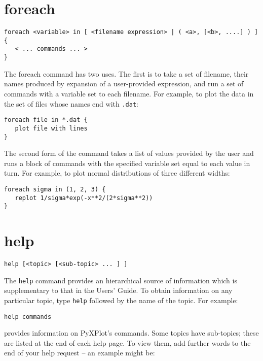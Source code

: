 \section{foreach}

\begin{verbatim}
foreach <variable> in [ <filename expression> | ( <a>, [<b>, ....] ) ] {
   < ... commands ... >
}
\end{verbatim}

The foreach command has two uses.  The first is to take a set of filename, their
names produced by expansion of a user-provided expression, and run a set of
commands with a variable set to each filename.  For example, to plot the data in
the set of files whose names end with {\tt .dat}:

\begin{verbatim}
foreach file in *.dat {
   plot file with lines
}
\end{verbatim}

The second form of the command takes a list of values provided by the user and
runs a block of commands with the specified variable set equal to each value in
turn.  For example, to plot normal distributions of three different widths:

\begin{verbatim}
foreach sigma in (1, 2, 3) {
   replot 1/sigma*exp(-x**2/(2*sigma**2))
}
\end{verbatim}

\section{help}

\begin{verbatim}
help [<topic> [<sub-topic> ... ] ]
\end{verbatim}

The {\tt help} command provides an hierarchical source of information which
is supplementary to that in the Users' Guide.  To obtain information on any
particular topic, type {\tt help} followed by the name of the topic. For
example:

\begin{verbatim}
help commands
\end{verbatim}

\noindent provides information on PyXPlot's commands. Some topics have
sub-topics; these are listed at the end of each help page. To view them, add
further words to the end of your help request -- an example might be:


